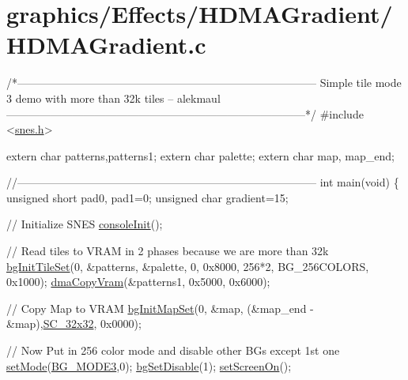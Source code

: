 \hypertarget{a00404}{}\section{graphics/\+Effects/\+H\+D\+M\+A\+Gradient/\+H\+D\+M\+A\+Gradient.\+c}

\begin{DoxyCodeInclude}
\textcolor{comment}{/*---------------------------------------------------------------------------------}
\textcolor{comment}{}
\textcolor{comment}{}
\textcolor{comment}{    Simple tile mode 3 demo with more than 32k tiles}
\textcolor{comment}{    -- alekmaul}
\textcolor{comment}{}
\textcolor{comment}{}
\textcolor{comment}{---------------------------------------------------------------------------------*/}
\textcolor{preprocessor}{#include <\hyperlink{a00356}{snes.h}>}

\textcolor{keyword}{extern} \textcolor{keywordtype}{char} patterns,patterns1;
\textcolor{keyword}{extern} \textcolor{keywordtype}{char} palette;
\textcolor{keyword}{extern} \textcolor{keywordtype}{char} map, map\_end;

\textcolor{comment}{//---------------------------------------------------------------------------------}
\textcolor{keywordtype}{int} main(\textcolor{keywordtype}{void}) \{
    \textcolor{keywordtype}{unsigned} \textcolor{keywordtype}{short} pad0, pad1=0;
    \textcolor{keywordtype}{unsigned} \textcolor{keywordtype}{char} gradient=15;
    
    \textcolor{comment}{// Initialize SNES }
    \hyperlink{a00320_a6047713bb5a73afd3cd1d77e336bcdad}{consoleInit}();
    
    \textcolor{comment}{// Read tiles to VRAM in 2 phases because we are more than 32k}
    \hyperlink{a00317_ae09a7ac09be78eef0f28a6c7aabc82ad}{bgInitTileSet}(0, &patterns, &palette, 0, 0x8000, 256*2, BG\_256COLORS, 0x1000);
    \hyperlink{a00323_aaf545b3f811f6ef4b7c4be434701a77a}{dmaCopyVram}(&patterns1, 0x5000, 0x6000);

    \textcolor{comment}{// Copy Map to VRAM}
    \hyperlink{a00317_acc385296e159449a81d18f5e219c8032}{bgInitMapSet}(0, &map, (&map\_end - &map),\hyperlink{a00317_a11724b6748ce0954e9b43819263537fc}{SC\_32x32}, 0x0000);

    \textcolor{comment}{// Now Put in 256 color mode and disable other BGs except 1st one}
    \hyperlink{a00353_afd9e46ae627d055dd8c98a4b0ebb73b1}{setMode}(\hyperlink{a00317_ab74253172bcb87b7947118b746ab2849}{BG\_MODE3},0); \hyperlink{a00317_a4dbfb1b8854ff9ca4a7d11a899281bbb}{bgSetDisable}(1); 
    \hyperlink{a00353_abc7d4ef8ebc22f5b710927909bb3f144}{setScreenOn}();


\end{DoxyCodeInclude}
